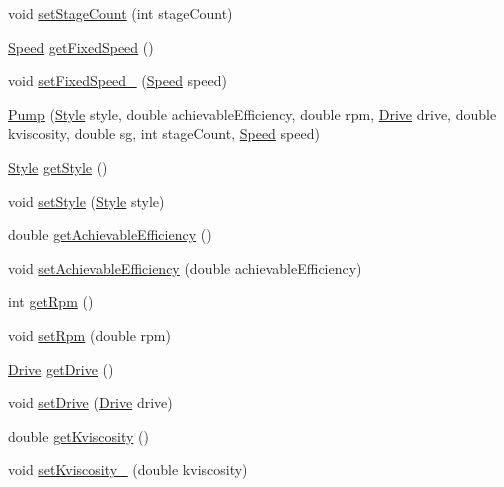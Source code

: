 \begin{DoxyCompactItemize}
\item 
void \hyperlink{class_pump_a28943405616a792c970b7e9bbf01c1b2}{set\+Stage\+Count} (int stage\+Count)
\item 
\hyperlink{class_pump_ae443603074ebca82f0b89209482d10b6}{Speed} \hyperlink{class_pump_ae9a63b7e616ba2ef7723d1040af241b4}{get\+Fixed\+Speed} ()
\item 
void \hyperlink{class_pump_a9e74b484f468a14076fb12d8b991e24b}{set\+Fixed\+Speed\+\_\+} (\hyperlink{class_pump_ae443603074ebca82f0b89209482d10b6}{Speed} speed)
\item 
\hyperlink{class_pump_a40479645281006efd81d3074f64d84ea}{Pump} (\hyperlink{class_pump_aef354601ce4218258cc898b35a1e90ff}{Style} style, double achievable\+Efficiency, double rpm, \hyperlink{class_pump_a32bf0ade131a11bb3b3fb374f638e983}{Drive} drive, double kviscosity, double sg, int stage\+Count, \hyperlink{class_pump_ae443603074ebca82f0b89209482d10b6}{Speed} speed)
\item 
\hyperlink{class_pump_aef354601ce4218258cc898b35a1e90ff}{Style} \hyperlink{class_pump_ab75d877769b5232c5ab7b4d92940579a}{get\+Style} ()
\item 
void \hyperlink{class_pump_a4852cb47f40a46ba84c7dff91d1abd53}{set\+Style} (\hyperlink{class_pump_aef354601ce4218258cc898b35a1e90ff}{Style} style)
\item 
double \hyperlink{class_pump_acf100af543142ab8404fc0ce2df1d157}{get\+Achievable\+Efficiency} ()
\item 
void \hyperlink{class_pump_a183f83fcc4b77e330451000df4d91046}{set\+Achievable\+Efficiency} (double achievable\+Efficiency)
\item 
int \hyperlink{class_pump_a66870deae37979d64a910b89c6977b26}{get\+Rpm} ()
\item 
void \hyperlink{class_pump_a7478d85c3b89cda275b039673603a785}{set\+Rpm} (double rpm)
\item 
\hyperlink{class_pump_a32bf0ade131a11bb3b3fb374f638e983}{Drive} \hyperlink{class_pump_a7eae412e42d0a3351408391cd5fbef4e}{get\+Drive} ()
\item 
void \hyperlink{class_pump_a54b6fc1aa44cc8377914ccb94738723a}{set\+Drive} (\hyperlink{class_pump_a32bf0ade131a11bb3b3fb374f638e983}{Drive} drive)
\item 
double \hyperlink{class_pump_a7b834ffb06cbfd643043e3a26ca1af6e}{get\+Kviscosity} ()
\item 
void \hyperlink{class_pump_a26d1d10908f91137f5148540ceb6520a}{set\+Kviscosity\+\_\+} (double kviscosity)
\item 

\end{DoxyCompactItemize}
